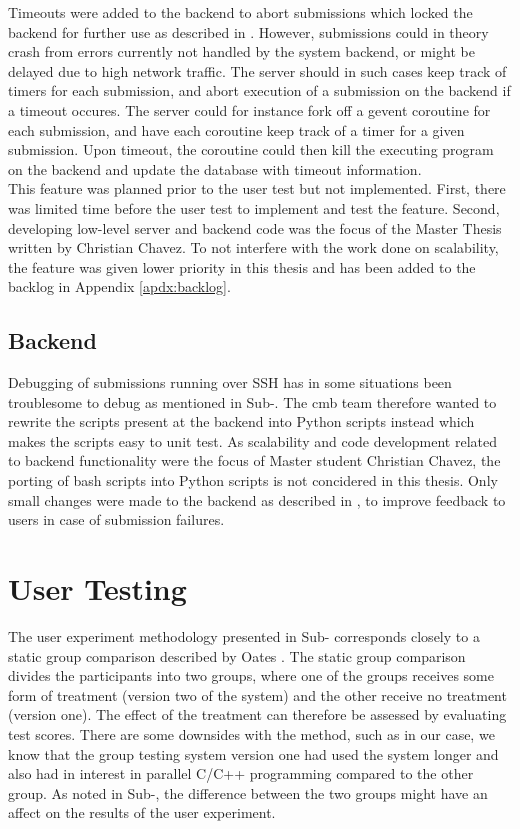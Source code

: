 Timeouts were added to the backend to abort submissions which locked the backend for further use as described in . However, submissions could in theory crash from errors currently not handled by the system backend, or might be delayed due to high network traffic. The server should in such cases keep track of timers for each submission, and abort execution of a submission on the backend if a timeout occures. The server could for instance fork off a gevent coroutine for each submission, and have each coroutine keep track of a timer for a given submission. Upon timeout, the coroutine could then kill the executing program on the backend and update the database with timeout information. \\

This feature was planned prior to the user test but not implemented. First, there was limited time before the user test to implement and test the feature. Second, developing low-level server and backend code was the focus of the Master Thesis written by Christian Chavez. To not interfere with the work done on scalability, the feature was given lower priority in this thesis and has been added to the backlog in Appendix \ref{apdx:backlog}.

\subsection{Backend}
Debugging of submissions running over SSH has in some situations been troublesome to debug as mentioned in Sub-. The \gls{cmb} team therefore wanted to rewrite the scripts present at the backend into Python scripts instead which makes the scripts easy to unit test. As scalability and code development related to backend functionality were the focus of Master student Christian Chavez, the porting of bash scripts into Python scripts is not concidered in this thesis. Only small changes were made to the backend as described in , to improve feedback to users in case of submission failures.

\section{User Testing}
\label{sec:eval-user-testing}
The user experiment methodology presented in Sub- corresponds closely to a static group comparison described by Oates \cite{Oates2006}. The static group comparison divides the participants into two groups, where one of the groups receives some form of treatment (version two of the system) and the other receive no treatment (version one). The effect of the treatment can therefore be assessed by evaluating test scores. There are some downsides with the method, such as in our case, we know that the group testing system version one had used the system longer and also had in interest in parallel C/C++ programming compared to the other group. As noted in Sub-, the difference between the two groups might have an affect on the results of the user experiment. \\

